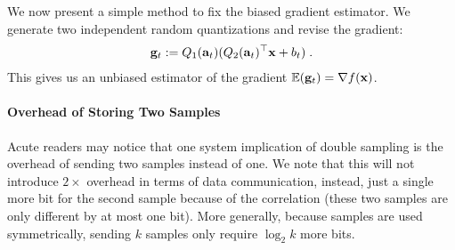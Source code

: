 We now present a simple method to fix the biased gradient estimator. We generate two independent random quantizations and revise the gradient:
\begin{align}
{\bf g}_t := Q_1 ({\bf a}_t) (Q_2 ({\bf a}_t)^\top {\bf x} + b_t) \; .
\label{eq:double}
\end{align}
This gives us an unbiased estimator of the gradient $\mathbb{E}({\bf g}_t) = \nabla f({\bf x})$. 

\paragraph*{Overhead of Storing Two Samples}
Acute readers may notice that one system implication of double sampling is the overhead of sending
two samples instead of one. We note that this will not introduce $2\times$
overhead in terms of data communication, instead, just a single more bit
for the second sample because of the correlation (these two samples 
are only different by at most one bit). More generally, because samples
are used symmetrically, sending $k$ samples only require $\log_2 k$ more bits.

